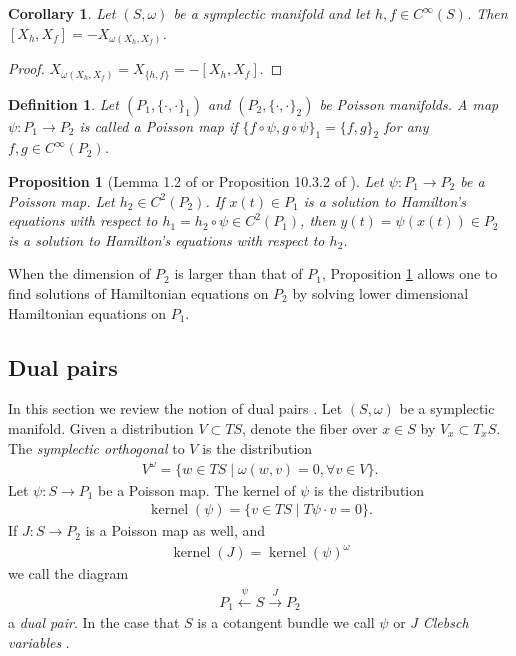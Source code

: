 \documentclass[12pt]{amsart}
\newtheorem{prop}[thm]{Proposition}
\newtheorem{cor}[thm]{Corollary}
\newtheorem{defn}[thm]{Definition}
\DeclareMathOperator{\kernel}{kernel}
\begin{document}
\begin{cor} \label{cor:Lie_hom}
  Let $(S,\omega)$ be a symplectic manifold
  and let $h,f \in C^{\infty}(S)$.
  Then $[X_h , X_f] = -X_{\omega(X_h,X_f) }$.
\end{cor}
\begin{proof}
  $X_{\omega(X_h,X_f)} = X_{ \{h,f\} } = -[X_h , X_f]$.
\end{proof}

\begin{defn}
  Let $(P_1, \{ \cdot , \cdot \}_1)$ and $(P_2, \{ \cdot , \cdot \}_2)$
  be Poisson manifolds.
  A map $\psi:P_1 \to P_2$ is called a
  \emph{Poisson map} if $\{ f \circ \psi , g \circ \psi \}_1 = \{ f , g \}_2$  for any $f,g \in C^{\infty}(P_2)$.
\end{defn}


\begin{prop}[Lemma 1.2 of \cite{Weinstein1983} or Proposition 10.3.2 of \cite{MandS}] \label{prop:Poisson_dynamics}
  Let $\psi:P_1 \to P_2$ be a Poisson map.
  Let $h_2 \in C^2(P_2)$.
  If $x(t) \in P_1$ is a solution to Hamilton's equations with respect
  to $h_1 = h_2 \circ \psi \in C^2(P_1)$, then $y(t) = \psi(x(t)) \in P_2$ is a solution
  to Hamilton's equations with respect to $h_2$.
\end{prop}

  When the dimension of $P_2$ is larger than that of $P_1$,
  Proposition \ref{prop:Poisson_dynamics} allows one to find solutions of
  Hamiltonian equations on $P_2$
  by solving lower dimensional Hamiltonian equations
  on $P_1$.
  \subsection{Dual pairs}
  In this section we review the notion of dual pairs
  \cite{MarsdenWeinstein1983,Weinstein1983,Gay-BalmazVizman2011}.
  Let $(S,\omega)$ be a symplectic manifold.
  Given a distribution $V \subset TS$, denote the fiber over 
  $x \in S$ by $V_x \subset T_x S$.
  The \emph{symplectic orthogonal} to $V$ is the distribution
  \begin{align*}
    V^\omega = \{ w \in TS \mid \omega( w , v ) = 0, \forall v \in V \}.
  \end{align*}
  Let $\psi:S \to P_1$ be a Poisson map.
  The kernel of $\psi$ is the distribution
  \begin{align*}
    \kernel(\psi) = \{ v \in TS \mid T\psi \cdot v  = 0 \}.
  \end{align*}
  If $J:S \to P_2$ is a Poisson map as well, and
  \begin{align*}
    \kernel(J) = \kernel(\psi)^\omega
  \end{align*}
  we call the diagram
  \begin{align*}
    P_1 \stackrel{\psi}{\leftarrow} S \stackrel{J}{\to} P_2
  \end{align*}
  a \emph{dual pair}.
  In the case that $S$ is a cotangent bundle we call $\psi$ or $J$
  \emph{Clebsch variables} \cite{MarsdenWeinstein1983}.
\end{document}

